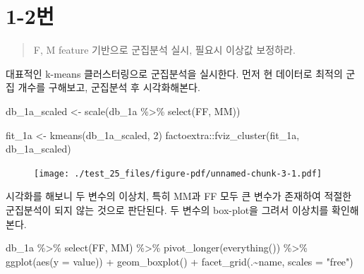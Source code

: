 \documentclass[
  letterpaper,
  DIV=11,
  numbers=noendperiod]{scrreprt}
\newenvironment{Shaded}{\begin{snugshade}}{\end{snugshade}}
\newcommand{\AttributeTok}[1]{\textcolor[rgb]{0.40,0.45,0.13}{#1}}
\newcommand{\DecValTok}[1]{\textcolor[rgb]{0.68,0.00,0.00}{#1}}
\newcommand{\FunctionTok}[1]{\textcolor[rgb]{0.28,0.35,0.67}{#1}}
\newcommand{\NormalTok}[1]{\textcolor[rgb]{0.00,0.23,0.31}{#1}}
\newcommand{\OtherTok}[1]{\textcolor[rgb]{0.00,0.23,0.31}{#1}}
\newcommand{\SpecialCharTok}[1]{\textcolor[rgb]{0.37,0.37,0.37}{#1}}
\newcommand{\StringTok}[1]{\textcolor[rgb]{0.13,0.47,0.30}{#1}}
\begin{document}
\hypertarget{uxbc88-40}{%
\section*{1-2번}\label{uxbc88-40}}


\begin{quote}
F, M feature 기반으로 군집분석 실시, 필요시 이상값 보정하라.
\end{quote}

대표적인 k-means 클러스터링으로 군집분석을 실시한다. 먼저 현 데이터로
최적의 군집 개수를 구해보고, 군집분석 후 시각화해본다.

\begin{Shaded}
\begin{Highlighting}[]
\NormalTok{db\_1a\_scaled }\OtherTok{\textless{}{-}} \FunctionTok{scale}\NormalTok{(db\_1a }\SpecialCharTok{\%\textgreater{}\%} \FunctionTok{select}\NormalTok{(FF, MM))}

\NormalTok{fit\_1a }\OtherTok{\textless{}{-}} \FunctionTok{kmeans}\NormalTok{(db\_1a\_scaled, }\DecValTok{2}\NormalTok{)}
\NormalTok{factoextra}\SpecialCharTok{::}\FunctionTok{fviz\_cluster}\NormalTok{(fit\_1a, db\_1a\_scaled)}
\end{Highlighting}
\end{Shaded}

\begin{figure}[H]

{\centering \texttt{[image: ./test\_25\_files/figure-pdf/unnamed-chunk-3-1.pdf]}

}

\end{figure}

시각화를 해보니 두 변수의 이상치, 특히 MM과 FF 모두 큰 변수가 존재하여
적절한 군집분석이 되지 않는 것으로 판단된다. 두 변수의 box-plot을 그려서
이상치를 확인해본다.

\begin{Shaded}
\begin{Highlighting}[]
\NormalTok{db\_1a }\SpecialCharTok{\%\textgreater{}\%} \FunctionTok{select}\NormalTok{(FF, MM) }\SpecialCharTok{\%\textgreater{}\%} \FunctionTok{pivot\_longer}\NormalTok{(}\FunctionTok{everything}\NormalTok{()) }\SpecialCharTok{\%\textgreater{}\%}
  \FunctionTok{ggplot}\NormalTok{(}\FunctionTok{aes}\NormalTok{(}\AttributeTok{y =}\NormalTok{ value)) }\SpecialCharTok{+}
  \FunctionTok{geom\_boxplot}\NormalTok{() }\SpecialCharTok{+}
  \FunctionTok{facet\_grid}\NormalTok{(.}\SpecialCharTok{\textasciitilde{}}\NormalTok{name, }\AttributeTok{scales =} \StringTok{"free"}\NormalTok{)}
\end{Highlighting}
\end{Shaded}
\end{document}
